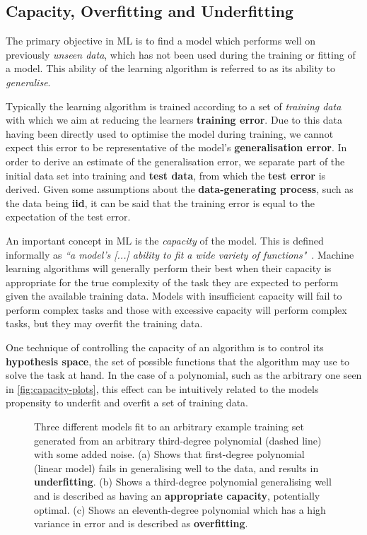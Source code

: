 \subsection{Capacity, Overfitting and Underfitting\label{sec:capoverunder}}
The primary objective in \gls{ML} is to find a model which performs well on
previously \textit{unseen data}, which has not been used during the training or
fitting of a model. This ability of the learning algorithm is referred to as its
ability to \textit{generalise}.

Typically the learning algorithm is trained according to a set of
\textit{training data} with which we aim at reducing the learners
\textbf{training error}. Due to this data having been directly used to optimise
the model during training, we cannot expect this error to be representative of
the model's \textbf{generalisation error}. In order to derive an estimate of the
generalisation error, we separate part of the initial data set into training and
\textbf{test data}, from which the \textbf{test error} is derived. Given some
assumptions about the \textbf{data-generating process}, such as the data being
\textbf{\gls{iid}}, it can be said that the training error is equal to the
expectation of the test error.

An important concept in \gls{ML} is the \textit{capacity} of the model. This is
defined informally as \textit{``a model’s [...] ability to fit a wide
variety of functions"}~\cite[p.~111-112]{Goodfellow-et-al-2016}. Machine learning
algorithms will generally perform their best when their capacity is appropriate
for the true complexity of the task they are expected to perform given the
available training data. Models with insufficient capacity will fail to perform
complex tasks and those with excessive capacity will perform complex tasks, but
they may overfit the training data.

One technique of controlling the capacity of an algorithm is to control its
\textbf{hypothesis space}, the set of possible functions that the algorithm may
use to solve the task at hand. In the case of a polynomial, such as the
arbitrary one seen in \autoref{fig:capacity-plots}, this effect can be
intuitively related to the models propensity to underfit and overfit a set of
training data.

\begin{figure}[htp]
    \centering
    
    \captionsetup{format=hang} %
    \caption{
        Three different models fit to an arbitrary example training set
        generated from an arbitrary third-degree polynomial (dashed line) with
        some added noise. (a) Shows that first-degree polynomial (linear model)
        fails in generalising well to the data, and results in
        \textbf{underfitting}. (b) Shows a third-degree polynomial generalising
        well and is described as having an \textbf{appropriate capacity},
        potentially optimal. (c) Shows an eleventh-degree polynomial which has a
        high variance in error and is described as \textbf{overfitting}.
    }
    \label{fig:capacity-plots}
\end{figure}

